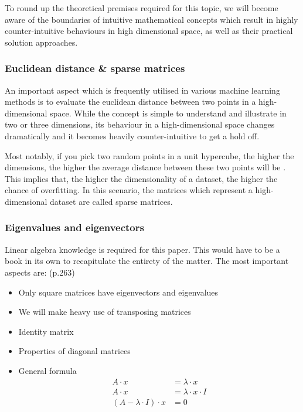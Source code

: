 
To round up the theoretical premises required for this topic, we will become aware of the boundaries of intuitive mathematical concepts which result in highly counter-intuitive behaviours in high dimensional space, as well as their practical solution approaches.

\subsubsection{Euclidean distance \& sparse matrices}

An important aspect which is frequently utilised in various machine learning methods is to evaluate the euclidean distance between two points in a high-dimensional space.
While the concept is simple to understand and illustrate in two or three dimensions, its behaviour in a high-dimensional space changes dramatically and it becomes heavily counter-intuitive to get a hold off.

Most notably, if you pick two random points in a unit hypercube, the higher the dimensions, the higher the average distance between these two points will be \cite{HandsOnMLCh8}.
This implies that, the higher the dimensionality of a dataset, the higher the chance of overfitting.
In this scenario, the matrices which represent a high-dimensional dataset are called sparse matrices.

\vspace{2mm}



\subsubsection{Eigenvalues and eigenvectors}

Linear algebra knowledge is required for this paper.
This would have to be a book in its own to recapitulate the entirety of the matter.
The most important aspects are: \cite{Strang2005tn} (p.263)

\begin{itemize}
	\item Only square matrices have eigenvectors and eigenvalues
	\item We will make heavy use of transposing matrices
	\item Identity matrix
	\item Properties of diagonal matrices
	\item General formula
	\begin{align}
		\label{formula:one}
		A \cdot x &= \lambda \cdot x 
		\\
		\label{formula:two}
		A \cdot x &= \lambda \cdot x \cdot I
		\\
		\label{formula:three}
		(A - \lambda \cdot I)\cdot x &= 0
	\end{align}
\end{itemize}



